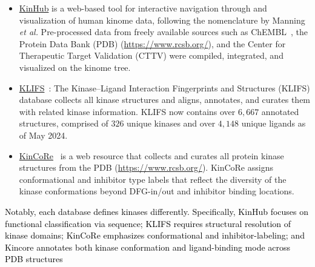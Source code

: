 \documentclass[9pt,lessons, pubversion]{livecoms}
\newcommand{\revision}[1]{\textcolor{black}{#1}}
\begin{document}
\begin{itemize}
\item {\href{http://www.kinhub.org/}{KinHub}} is a web-based tool for interactive navigation through and visualization of human kinome data, following the nomenclature by Manning \textit{et al.} Pre-processed data from freely available sources such as ChEMBL~\cite{zdrazil2024chembl}, the Protein Data Bank (PDB) (\url{https://www.rcsb.org/}), and the Center for Therapeutic Target Validation (CTTV) were compiled, integrated, and visualized on the kinome tree.~\cite{eid2017kinmap} 

\item {\href{https://klifs.net/}{KLIFS}}~\cite{Kanev2020}: The Kinase–Ligand Interaction Fingerprints and Structures (KLIFS) database collects all kinase structures and aligns, annotates, and curates them with related kinase information. KLIFS now contains over $6,667$ annotated structures, comprised of $326$ unique kinases and over $4,148$ unique ligands as of May 2024.

\item {\href{http://dunbrack.fccc.edu/kincore/home}{KinCoRe}}~\cite{Modi2021} is a web resource that collects and curates all protein kinase structures from the PDB (\url{https://www.rcsb.org/}). KinCoRe assigns conformational and inhibitor type labels that reflect the diversity of the kinase conformations beyond DFG-in/out and inhibitor binding locations. %

\end{itemize}
\revision{Notably, each database defines kinases differently. Specifically, KinHub focuses on functional classification via sequence; KLIFS requires structural resolution of kinase domains; KinCoRe emphasizes conformational and inhibitor-labeling; and Kincore annotates both kinase conformation and ligand-binding mode across PDB structures}
\end{document}
